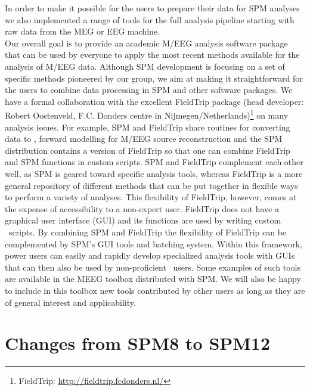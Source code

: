 In order to make it possible for the users to prepare their data for SPM analyses we also implemented a range of tools for the full analysis pipeline starting with raw data from the MEG or EEG machine.
\\
Our overall goal is to provide an academic M/EEG analysis software package that can be used by everyone to apply the most recent methods available for the analysis of M/EEG data. Although SPM development is focusing on a set of specific methods pioneered by our group, we aim at making it straightforward for the users to combine data processing in SPM and other software packages. We have a formal collaboration with the excellent FieldTrip package (head developer: Robert Oostenveld, F.C. Donders centre in Nijmegen/Netherlands)\footnote{FieldTrip: \url{http://fieldtrip.fcdonders.nl/}} on many analysis issues. For example, SPM and FieldTrip share routines for converting data to \matlab, forward modelling for M/EEG source reconstruction and the SPM distribution contains a version of FieldTrip so that one can combine FieldTrip and SPM functions in custom scripts. SPM and FieldTrip complement each other well, as SPM is geared toward specific analysis tools, whereas FieldTrip is a more general repository of different methods that can be put together in flexible ways to perform a variety of analyses. This flexibility of FieldTrip, however, comes at the expense of accessibility to a non-expert user. FieldTrip does not have a graphical user interface (GUI) and its functions are used by writing custom \matlab\ scripts. By combining SPM and FieldTrip the flexibility of FieldTrip can be complemented by SPM's GUI tools and batching system. Within this framework, power users can easily and rapidly develop specialized analysis tools with GUIs that can then  also be used by non-proficient \matlab\ users. Some examples of such tools are available in the MEEG toolbox distributed with SPM. We will also be happy to include in this toolbox new tools contributed by other users as long as they are of general interest and applicability. 

\section{Changes from SPM8 to SPM12}

